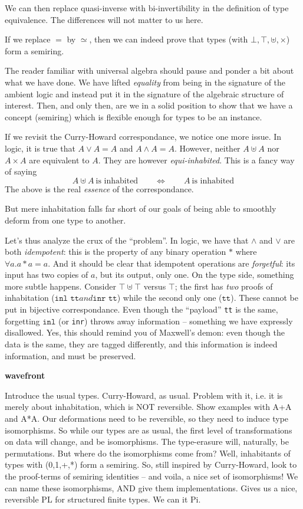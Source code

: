 \documentclass{article}
\newcommand{\jc}[1]{\fbox{Jacques says:} \textbf{#1}}
\begin{document}
\noindent We can then replace quasi-inverse with bi-invertibility in
the definition of type equivalence. The differences will not matter to
us here.

If we replace $=$ by $\simeq$, then we can indeed prove that
types (with $\bot, \top, \uplus, \times$) form a semiring.

The reader familiar with universal algebra should pause
and ponder a bit about what we have done. We have lifted 
\emph{equality} from being in the signature of the ambient logic
and instead put it in the signature of the algebraic structure
of interest. Then, and only then, are we in a solid position
to show that we have a concept (semiring) which is flexible 
enough for types to be an instance.

If we revisit the Curry-Howard correspondance, we notice one
more issue. In logic, it is true that $A \lor A = A$ and
$A \land A = A$. However, neither $A \uplus A$ nor $A \times A$ are
equivalent to $A$. They are however \emph{equi-inhabited}. This is
a fancy way of saying
\[ A \uplus A \ \text{is inhabited} \qquad \Leftrightarrow
  \qquad A \ \text{is inhabited} \]
The above is the real \textit{essence} of the correspondance.

But mere inhabitation falls far short of our goals of being
able to smoothly deform from one type to another.  

Let's thus analyze the crux of the ``problem''. In logic, we have
that $\land$ and $\lor$ are both \emph{idempotent}: this is the
property of any binary operation $*$ where
$\forall a. a * a = a$. And it should be clear that idempotent
operations are \emph{forgetful}: its input has two copies of $a$,
but its output, only one. On the type side, something more subtle
happens. Consider $\top \uplus \top$ versus $\top$; the first has
\emph{two} proofs of inhabitation ($\texttt{inl tt} and \texttt{inr tt}$)
while the second only one ($\texttt{tt}$). These cannot be put in
bijective correspondance. Even though the ``payload'' \texttt{tt}
is the same, forgetting $\texttt{inl}$ (or \texttt{inr}) throws
away information -- something we have expressly disallowed.
Yes, this should remind you of Maxwell's demon: even though the
data is the same, they are tagged differently, and this
information is indeed information, and must be preserved.

\jc{wavefront}

Introduce the usual types. Curry-Howard, as usual. Problem with it, i.e.
it is merely about inhabitation, which is NOT reversible. Show examples
with A+A and A*A. Our deformations need to be reversible, so they need
to induce type isomorphisms. So while our types are as usual, the
first level of transformations on data will change, and be isomorphisms.
The type-erasure will, naturally, be permutations. But where do the
isomorphisms come from?  Well, inhabitants of types with (0,1,+,*)
form a semiring. So, still inspired by Curry-Howard, look to the
proof-terms of semiring identities -- and voila, a nice set of
isomorphisms! We can name these isomorphisms, AND give them
implementations. Gives us a nice, reversible PL for
structured finite types. We can it Pi.
\end{document}
